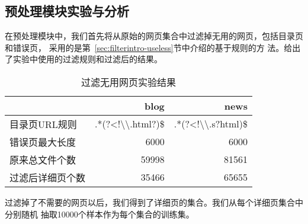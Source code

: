 \subsection{预处理模块实验与分析}
\label{sec:experiement:pre}
在预处理模块中，我们首先将从原始的网页集合中过滤掉无用的网页，包括目录页和错误页，
采用的是第~\ref{sec:filterintro-useless}节中介绍的基于规则的方
法。给出了实验中使用的过滤规则和过滤后的结果。
\begin{table}[h]
  \centering
\begin{tabular}{lrr}
  \toprule
 & blog & news \\
\hline
目录页URL规则 & .*(?<!\textbackslash\textbackslash.html?)\$ & .*(?<!\textbackslash\textbackslash.s?html)\$ \\
错误页最大长度 & 6000 & 6000 \\
原来总文件个数 & 59998 & 81561 \\
过滤后详细页个数 & 35466 & 65655 \\
\bottomrule
\end{tabular}
  \caption{过滤无用网页实验结果}
  \label{experiment:tab:filter}
\end{table}
\begin{comment}
#+ORGTBL: SEND 过滤无用网页 orgtbl-to-latex :splice nil :skip 0
|                  |                                       blog |                                        news |
|------------------+--------------------------------------------+---------------------------------------------|
| 目录页URL规则    | .*(?<!\textbackslash\textbackslash.html?)$ | .*(?<!\textbackslash\textbackslash.s?html)$ |
| 错误页最大长度   |                                       6000 |                                        6000 |
| 原来总文件个数   |                                      59998 |                                       81561 |
| 过滤后详细页个数 |                                      35466 |                                       65655 |
\end{comment}

过滤掉了不需要的网页以后，我们得到了详细页的集合。我们从每个详细页集合中分别随机
抽取10000个样本作为每个集合的训练集。

